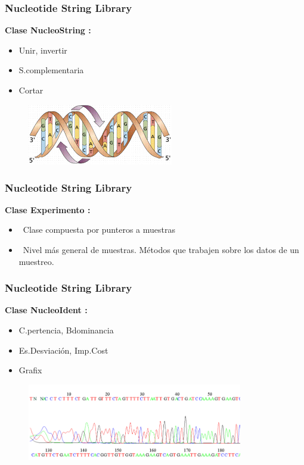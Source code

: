 \documentclass{beamer}
\begin{document}
\begin{frame}
\frametitle{Nucleotide String Library}
\textbf{\large{Clase NucleoString :}}
\begin{itemize}
\item{Unir, invertir}
\item{S.complementaria}
\item{Cortar}
\end{itemize}
\begin{figure}
		\includegraphics[width=2.5in]{ADN.jpg}
\end{figure}
\end{frame}

\begin{frame}
\frametitle{Nucleotide String Library}
\textbf{\large{Clase Experimento :}}
\begin{itemize}
\item \ Clase compuesta por punteros a muestras
\\
\item \ Nivel más general de muestras. Métodos que trabajen sobre los datos de un muestreo.
\end{itemize}
\end{frame}

\begin{frame}
\frametitle{Nucleotide String Library}
\textbf{\large{Clase NucleoIdent :}}
\begin{itemize}
\item{C.pertencia, Bdominancia}
\item{Es.Desviaci\'on, Imp.Cost}
\item{Grafix}
\end{itemize}
\begin{figure}
		\includegraphics[width=3.7in]{muestra.png}
\end{figure}
\end{frame}
\end{document}
